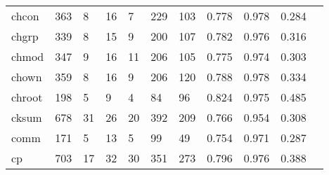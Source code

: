 \begin{longtable}{lp{1.10cm}p{1.10cm}p{1.10cm}p{1.10cm}p{1.10cm}p{1.10cm}p{1.10cm}p{1.10cm}p{1.10cm}p{1.10cm}}
chcon     &                    363 &                                  8 &                                16 &                                7 &                               229 &                             103 &                             0.778 &                                 0.978 &                               0.284 \\
chgrp     &                    339 &                                  8 &                                15 &                                9 &                               200 &                             107 &                             0.782 &                                 0.976 &                               0.316 \\
chmod     &                    347 &                                  9 &                                16 &                               11 &                               206 &                             105 &                             0.775 &                                 0.974 &                               0.303 \\
chown     &                    359 &                                  8 &                                16 &                                9 &                               206 &                             120 &                             0.788 &                                 0.978 &                               0.334 \\
chroot    &                    198 &                                  5 &                                 9 &                                4 &                                84 &                              96 &                             0.824 &                                 0.975 &                               0.485 \\
cksum     &                    678 &                                 31 &                                26 &                               20 &                               392 &                             209 &                             0.766 &                                 0.954 &                               0.308 \\
comm      &                    171 &                                  5 &                                13 &                                5 &                                99 &                              49 &                             0.754 &                                 0.971 &                               0.287 \\
cp        &                    703 &                                 17 &                                32 &                               30 &                               351 &                             273 &                             0.796 &                                 0.976 &                               0.388 \\

\end{longtable}
